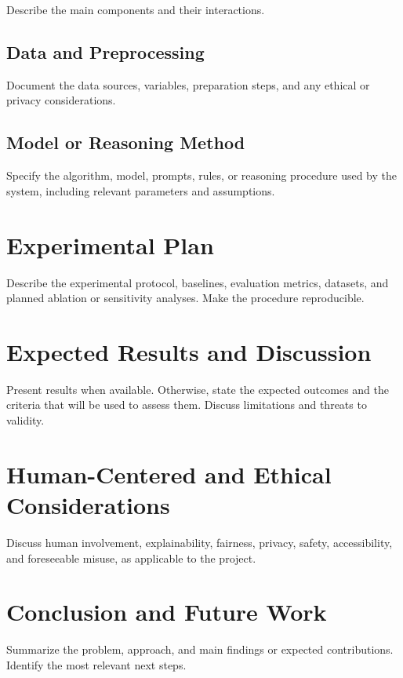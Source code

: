 \documentclass{article}
\begin{document}
Describe the main components and their interactions.

\subsection{Data and Preprocessing}
\label{sec:data}

Document the data sources, variables, preparation steps, and any ethical or
privacy considerations.

\subsection{Model or Reasoning Method}
\label{sec:method}

Specify the algorithm, model, prompts, rules, or reasoning procedure used by
the system, including relevant parameters and assumptions.

\section{Experimental Plan}
\label{sec:experiments}

Describe the experimental protocol, baselines, evaluation metrics, datasets,
and planned ablation or sensitivity analyses. Make the procedure reproducible.

\section{Expected Results and Discussion}
\label{sec:results}

Present results when available. Otherwise, state the expected outcomes and the
criteria that will be used to assess them. Discuss limitations and threats to
validity.

\section{Human-Centered and Ethical Considerations}
\label{sec:ethics}

Discuss human involvement, explainability, fairness, privacy, safety,
accessibility, and foreseeable misuse, as applicable to the project.

\section{Conclusion and Future Work}
\label{sec:conclusion}

Summarize the problem, approach, and main findings or expected contributions.
Identify the most relevant next steps.
\end{document}
